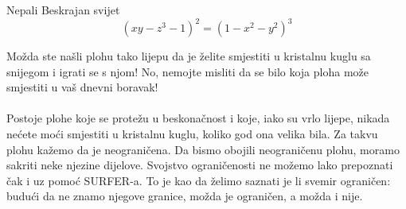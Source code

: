 \begin{surferPage}{Nepali}
Beskrajan svijet\\

\smallskip
\[(x y - z^3 -1)^2= (1 - x^2	- y^2)^3\]

\singlespacing
Mo\v{z}da ste na\v{s}li plohu tako lijepu da je \v{z}elite smjestiti u kristalnu kuglu sa snijegom i igrati se s njom! No, nemojte misliti da se bilo koja ploha mo\v{z}e smjestiti u va\v{s} dnevni boravak!
\\
\singlespacing
\\
Postoje plohe koje se prote\v{z}u u beskona\v{c}nost i koje, iako su vrlo lijepe, nikada ne\'{c}ete mo\'{c}i smjestiti u kristalnu kuglu, koliko god ona velika bila. Za takvu plohu ka\v{z}emo da je neograni\v{c}ena. Da bismo obojili neograni\v{c}enu plohu, moramo sakriti neke njezine dijelove.
\singlespacing
Svojstvo ograni\v{c}enosti ne mo\v{z}emo lako prepoznati \v{c}ak i uz pomo\'{c} SURFER-a. To je kao da \v{z}elimo saznati je li svemir ograni\v{c}en: budu\'{c}i da ne znamo njegove granice, mo\v{z}da je ograni\v{c}en, a mo\v{z}da i nije.
\end{surferPage}
